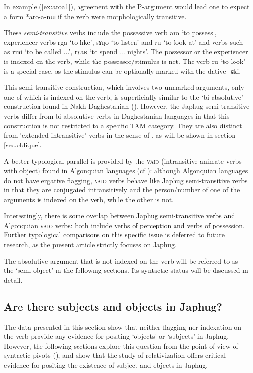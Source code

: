 \documentclass[oldfontcommands,oneside,a4paper,11pt]{article}
\newcommand{\ipa}[1]{{\phon #1}} %
\newcommand{\refb}[1]{(\ref{#1})}
\begin{document}
 
In example \refb{ex:aroa1}, agreement with the P-argument would lead one to expect a form *\ipa{aro-a-nɯ} if the verb were morphologically transitive.
  

  These  \textit{semi-transitive} verbs   include the possessive verb \ipa{aro} `to possess',  experiencer verbs \ipa{rga} `to like', \ipa{sɤŋo} `to listen' and \ipa{ru} `to look at' and verbs such as \ipa{rmi} `to be called ...', \ipa{rʑaʁ} `to spend ... nights'. The possessor or the experiencer is indexed on the verb, while the possessee/stimulus is not. The verb \ipa{ru} `to look' is a special case, as the stimulus can be optionally marked with the dative \ipa{-ɕki}. 

This semi-transitive construction, which involves two unmarked arguments, only one of which is indexed on the verb, is superficially similar to the `bi-absolutive' construction found in Nakh-Daghestanian (\citealt{forker12biabsolutive}). However, the Japhug semi-transitive verbs differ from bi-absolutive verbs in Daghestanian languages in that this construction is not restricted to a specific TAM category. They are also distinct from 'extended intransitive' verbs in the sense of \citet[3]{dixon00valency}, as will be shown in section \ref{sec:oblique}.


A better typological parallel is provided by the  \textsc{vaio} (intransitive animate verbs with object) found in Algonquian languages (cf  \citealt[242]{valentine01grammar}): although Algonquian languages do not have ergative flagging, \textsc{vaio} verbs behave like Japhug semi-transitive verbs in that they are conjugated intransitively and the person/number of one of the arguments is indexed on the verb, while the other is not.

Interestingly, there is some overlap between Japhug semi-transitive verbs and Algonquian \textsc{vaio} verbs: both include verbs of perception and verbs of possession. Further typological comparisons on this specific issue is deferred to future research, as the present article strictly focuses on Japhug.

The absolutive argument that is not indexed on the verb will be referred to as the `semi-object' in the following sections. Its  syntactic status will be discussed in detail.

\subsection{Are there subjects and objects in Japhug?}
The data presented in this section show that neither flagging nor indexation on the verb provide any evidence for positing `objects' or `subjects' in Japhug. However, the following sections explore this question from the point of view of syntactic pivots (\citealt[275]{vanvalin97syntax}), and show that the study of relativization offers critical evidence for positing the existence of subject and objects in Japhug.
\end{document}
